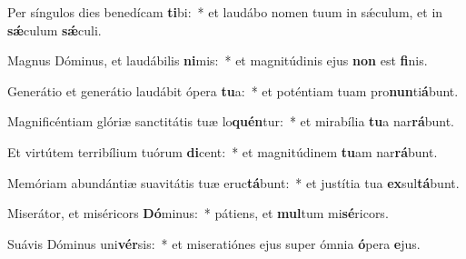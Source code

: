 \item Per síngulos dies benedícam \textbf{ti}bi:~* et laudábo nomen tuum in sǽculum, et in \textbf{sǽ}culum \textbf{sǽ}culi.
\item Magnus Dóminus, et laudábilis \textbf{ni}mis:~* et magnitúdinis ejus \textbf{non} est \textbf{fi}nis.
\item Generátio et generátio laudábit ópera \textbf{tu}a:~* et poténtiam tuam pro\textbf{nun}ti\textbf{á}bunt.
\item Magnificéntiam glóriæ sanctitátis tuæ lo\textbf{quén}tur:~* et mirabília \textbf{tu}a nar\textbf{rá}bunt.
\item Et virtútem terribílium tuórum \textbf{di}cent:~* et magnitúdinem \textbf{tu}am nar\textbf{rá}bunt.
\item Memóriam abundántiæ suavitátis tuæ eruc\textbf{tá}bunt:~* et justítia tua \textbf{ex}sul\textbf{tá}bunt.
\item Miserátor, et miséricors \textbf{Dó}minus:~* pátiens, et \textbf{mul}tum mi\textbf{sé}ricors.
\item Suávis Dóminus uni\textbf{vér}sis:~* et miseratiónes ejus super ómnia \textbf{ó}pera \textbf{e}jus.
